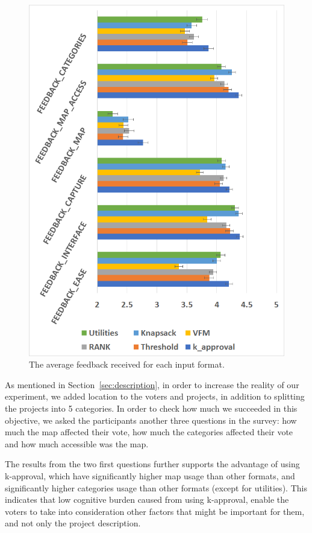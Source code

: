 \documentclass[10pt]{article}
\begin{document}
\begin{figure}[!htbp]
\begin{center}
\includegraphics[width=15cm]{experiment/feedback.png}
\caption{The average feedback received for each input format.
}\label{fig:feedback}
\end{center}
\end{figure}

As mentioned in Section~\ref{sec:description}, in order to increase the reality of our experiment, we added location to the voters and projects, in addition to splitting the projects into 5 categories.
In order to check how much we succeeded in this objective, we asked the participants another three questions in the survey: how much the map affected their vote, how much the categories affected their vote and how much accessible was the map.

The results from the two first questions further supports the advantage of using k-approval, which have significantly higher map usage than other formats, and significantly higher categories usage than other formats (except for utilities). This indicates that low cognitive burden caused from using k-approval, enable the voters to take into consideration other factors that might be important for them, and not only the project description.
\end{document}
